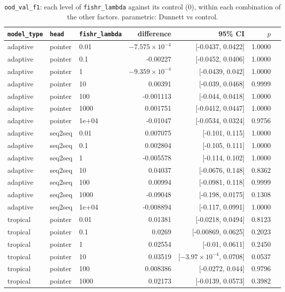 \documentclass[10pt]{article}
\begin{document}
{\small
\begin{longtable}{lllrrrl}
\caption{\texttt{ood\_val\_f1}: each level of \texttt{fishr\_lambda} against its control (0), within each combination of the other factors. parametric: Dunnett vs control.}\label{tab:control-ood_val_f1}\\
\toprule
\texttt{model\_type} & \texttt{head} & \texttt{fishr\_lambda} & difference & 95\% CI & $p$ & \\
\midrule
\endhead
adaptive & pointer & 0.01 & $-7.575\times10^{-4}$ & [-0.0437, 0.0422] & 1.0000 & \\
adaptive & pointer & 0.1 & -0.00227 & [-0.0452, 0.0406] & 1.0000 & \\
adaptive & pointer & 1 & $-9.359\times10^{-4}$ & [-0.0439, 0.042] & 1.0000 & \\
adaptive & pointer & 10 & 0.00391 & [-0.039, 0.0468] & 0.9999 & \\
adaptive & pointer & 100 & -0.001113 & [-0.044, 0.0418] & 1.0000 & \\
adaptive & pointer & 1000 & 0.001751 & [-0.0412, 0.0447] & 1.0000 & \\
adaptive & pointer & 1e+04 & -0.01047 & [-0.0534, 0.0324] & 0.9756 & \\
adaptive & seq2seq & 0.01 & 0.007075 & [-0.101, 0.115] & 1.0000 & \\
adaptive & seq2seq & 0.1 & 0.002804 & [-0.105, 0.111] & 1.0000 & \\
adaptive & seq2seq & 1 & -0.005578 & [-0.114, 0.102] & 1.0000 & \\
adaptive & seq2seq & 10 & 0.04037 & [-0.0676, 0.148] & 0.8362 & \\
adaptive & seq2seq & 100 & 0.00994 & [-0.0981, 0.118] & 0.9999 & \\
adaptive & seq2seq & 1000 & -0.09048 & [-0.198, 0.0175] & 0.1308 & \\
adaptive & seq2seq & 1e+04 & -0.008894 & [-0.117, 0.0991] & 1.0000 & \\
tropical & pointer & 0.01 & 0.01381 & [-0.0218, 0.0494] & 0.8123 & \\
tropical & pointer & 0.1 & 0.0269 & [-0.00869, 0.0625] & 0.2023 & \\
tropical & pointer & 1 & 0.02554 & [-0.01, 0.0611] & 0.2450 & \\
tropical & pointer & 10 & 0.03519 & [$-3.97\times10^{-4}$, 0.0708] & 0.0537 & \\
tropical & pointer & 100 & 0.008386 & [-0.0272, 0.044] & 0.9796 & \\
tropical & pointer & 1000 & 0.02173 & [-0.0139, 0.0573] & 0.3982 & \\

\end{longtable}}
\end{document}
